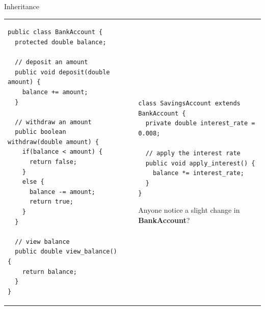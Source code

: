 \documentclass{beamer}
\makeatletter
\newenvironment{splitslide}
{
\centering
\begin{tabular}{@{}p{0.50\textwidth} | p{0.025\textwidth}@{} p{0.4\textwidth}@{}}
}
{
\end{tabular}
}
\makeatother
\begin{document}
\begin{frame}[fragile]{Inheritance}
\begin{splitslide}

\begin{Verbatim}[fontsize=\tiny]
public class BankAccount {
  protected double balance;
  
  // deposit an amount
  public void deposit(double amount) {
    balance += amount;
  }
  
  // withdraw an amount
  public boolean withdraw(double amount) {
    if(balance < amount) {
      return false;
    }
    else {
      balance -= amount;
      return true;
    }
  }
  
  // view balance
  public double view_balance() {
    return balance;  
  }
}
\end{Verbatim}

&&

\begin{Verbatim}[fontsize=\tiny]
class SavingsAccount extends BankAccount {
  private double interest_rate = 0.008;
  
  // apply the interest rate
  public void apply_interest() {
    balance *= interest_rate;
  }
}
\end{Verbatim}


\vspace{1.5em}
\raggedright
Anyone notice a slight change in \textbf{BankAccount}?

\end{splitslide}
\end{frame}
\end{document}
